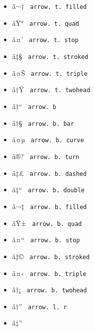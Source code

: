 \begin{itemize}
\item
  \label{symbol-arrow.t.filled}{{ â¬† }
  \texttt{\ arrow.\ t.\ filled\ }}
\item
  \label{symbol-arrow.t.quad}{{ âŸ° }
  \texttt{\ arrow.\ t.\ quad\ }}
\item
  \label{symbol-arrow.t.stop}{{ â¤' }
  \texttt{\ arrow.\ t.\ stop\ }}
\item
  \label{symbol-arrow.t.stroked}{{ â‡§ }
  \texttt{\ arrow.\ t.\ stroked\ }}
\item
  \label{symbol-arrow.t.triple}{{ â¤Š }
  \texttt{\ arrow.\ t.\ triple\ }}
\item
  \label{symbol-arrow.t.twohead}{{ â†Ÿ }
  \texttt{\ arrow.\ t.\ twohead\ }}
\item
  \label{symbol-arrow.b}{{ â†`` } \texttt{\ arrow.\ b\ }}
\item
  \label{symbol-arrow.b.bar}{{ â†§ }
  \texttt{\ arrow.\ b.\ bar\ }}
\item
  \label{symbol-arrow.b.curve}{{ â¤µ }
  \texttt{\ arrow.\ b.\ curve\ }}
\item
  \label{symbol-arrow.b.turn}{{ â®? }
  \texttt{\ arrow.\ b.\ turn\ }}
\item
  \label{symbol-arrow.b.dashed}{{ â‡£ }
  \texttt{\ arrow.\ b.\ dashed\ }}
\item
  \label{symbol-arrow.b.double}{{ â‡`` }
  \texttt{\ arrow.\ b.\ double\ }}
\item
  \label{symbol-arrow.b.filled}{{ â¬‡ }
  \texttt{\ arrow.\ b.\ filled\ }}
\item
  \label{symbol-arrow.b.quad}{{ âŸ± }
  \texttt{\ arrow.\ b.\ quad\ }}
\item
  \label{symbol-arrow.b.stop}{{ â¤`` }
  \texttt{\ arrow.\ b.\ stop\ }}
\item
  \label{symbol-arrow.b.stroked}{{ â‡© }
  \texttt{\ arrow.\ b.\ stroked\ }}
\item
  \label{symbol-arrow.b.triple}{{ â¤‹ }
  \texttt{\ arrow.\ b.\ triple\ }}
\item
  \label{symbol-arrow.b.twohead}{{ â†¡ }
  \texttt{\ arrow.\ b.\ twohead\ }}
\item
  \label{symbol-arrow.l.r}{{ â†'' }
  \texttt{\ arrow.\ l.\ r\ }}
\item
  \label{symbol-arrow.l.r.double}{{ â‡'' }
}
\end{itemize}
